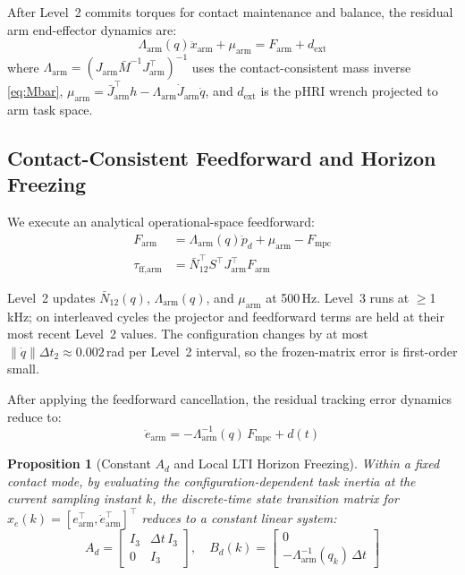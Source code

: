 \documentclass[journal]{IEEEtran}
\newtheorem{proposition}{Proposition}
\newcommand{\Mbar}{\bar{M}^{-1}}
\newcommand{\Larm}{\Lambda_{\text{arm}}}
\newcommand{\Fmpc}{F_{\text{mpc}}}
\newcommand{\Naug}{\bar{N}_{12}}
\begin{document}
After Level~2 commits torques for contact maintenance and balance, the
residual arm end-effector dynamics are:
\begin{equation}\label{eq:plant}
  \Larm(q)\ddot{x}_{\text{arm}}+\mu_{\text{arm}} = F_{\text{arm}}+d_{\text{ext}}
\end{equation}
where $\Larm=(J_{\text{arm}}\Mbar J_{\text{arm}}^\top)^{-1}$ uses the
contact-consistent mass inverse \eqref{eq:Mbar},
$\mu_{\text{arm}}=\bar{J}_{\text{arm}}^\top h - \Larm\dot{J}_{\text{arm}}\dot{q}$,
and $d_{\text{ext}}$ is the pHRI wrench projected to arm task space.

\subsection{Contact-Consistent Feedforward and Horizon Freezing}

We execute an analytical operational-space feedforward:
\begin{subequations}\label{eq:feedforward}
\begin{align}
  F_{\text{arm}} &= \Larm(q)\ddot{p}_d + \mu_{\text{arm}} - \Fmpc \label{eq:ff_a}\\
  \tau_{\text{ff,arm}} &= \Naug^\top S^\top J_{\text{arm}}^\top F_{\text{arm}} \label{eq:ff_b}
\end{align}
\end{subequations}

Level~2 updates $\Naug(q)$, $\Larm(q)$, and $\mu_{\text{arm}}$ at 500\,Hz.
Level~3 runs at $\geq$1\,kHz; on interleaved cycles the projector and
feedforward terms are held at their most recent Level~2 values.
The configuration changes by at most $\|\dot{q}\|\Delta t_2\approx0.002$\,rad
per Level~2 interval, so the frozen-matrix error is first-order small.

After applying the feedforward cancellation, the residual tracking error
dynamics reduce to:
\begin{equation}\label{eq:errordyn}
  \ddot{e}_{\text{arm}} = -\Larm^{-1}(q)\,\Fmpc + d(t)
\end{equation}

\begin{proposition}[Constant $A_d$ and Local LTI Horizon Freezing]
\label{prop:constant_Ad}
Within a fixed contact mode, by evaluating the configuration-dependent task
inertia at the current sampling instant $k$, the discrete-time state
transition matrix for $x_e(k)=[e_{\text{arm}}^\top,\dot{e}_{\text{arm}}^\top]^\top$
reduces to a constant linear system:
\begin{equation}\label{eq:Ad}
  A_d = \begin{bmatrix}I_3 & \Delta t\,I_3 \\ 0 & I_3\end{bmatrix},
  \quad
  B_d(k) = \begin{bmatrix}0 \\ -\Larm^{-1}(q_k)\,\Delta t\end{bmatrix}
\end{equation}
\end{proposition}
\end{document}
